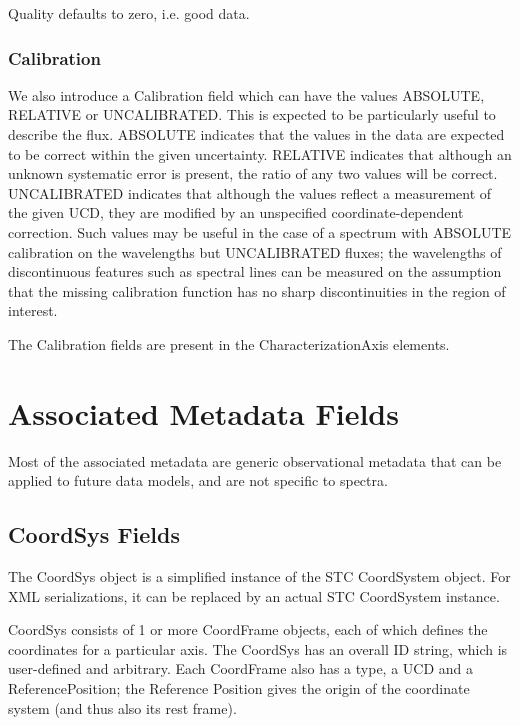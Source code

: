 \documentclass[11pt]{article}
\begin{document}
Quality defaults to zero, i.e. good data.

\subsubsection{Calibration}

{We also introduce a Calibration field which can have
the values ABSOLUTE, RELATIVE or UNCALIBRATED. This is expected
to be particularly useful to describe the flux. ABSOLUTE indicates
that the values in the data are expected to be correct within the
given uncertainty. RELATIVE indicates that although an unknown
systematic error is present, the ratio of any two values will be
correct. UNCALIBRATED indicates that although the values reflect a
measurement of the given UCD, they are modified by an unspecified
coordinate-dependent correction. Such values may be useful in the
case of a spectrum with ABSOLUTE calibration on the wavelengths
but UNCALIBRATED fluxes; the wavelengths of discontinuous features 
such as spectral lines can be
measured on the assumption that the missing calibration function
has no sharp discontinuities in the region of interest.
}

The Calibration fields are present in the CharacterizationAxis elements.



\clearpage

\section{Associated Metadata Fields}

Most of the associated metadata are generic observational
metadata that can be applied to future data models, and are
not specific to spectra.

\subsection{CoordSys Fields}

The CoordSys object is a simplified instance of the STC CoordSystem object.
For XML serializations, it can be replaced by an actual STC CoordSystem
instance.

  CoordSys consists of 1 or more CoordFrame objects, each of which defines
the coordinates for a particular axis. The CoordSys has an overall ID string,
which is user-defined and arbitrary. 
Each CoordFrame also has a type, a UCD and a ReferencePosition; the Reference
Position gives the origin of the coordinate system (and thus also its rest frame).
\end{document}
